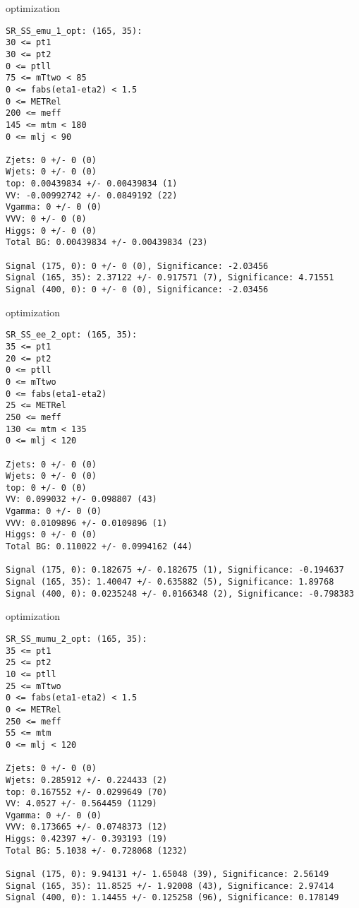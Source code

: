 \begin{frame}[fragile]{optimization}
\tiny
\begin{verbatim}
SR_SS_emu_1_opt: (165, 35):
30 <= pt1
30 <= pt2
0 <= ptll
75 <= mTtwo < 85
0 <= fabs(eta1-eta2) < 1.5
0 <= METRel
200 <= meff
145 <= mtm < 180
0 <= mlj < 90

Zjets: 0 +/- 0 (0)
Wjets: 0 +/- 0 (0)
top: 0.00439834 +/- 0.00439834 (1)
VV: -0.00992742 +/- 0.0849192 (22)
Vgamma: 0 +/- 0 (0)
VVV: 0 +/- 0 (0)
Higgs: 0 +/- 0 (0)
Total BG: 0.00439834 +/- 0.00439834 (23)

Signal (175, 0): 0 +/- 0 (0), Significance: -2.03456
Signal (165, 35): 2.37122 +/- 0.917571 (7), Significance: 4.71551
Signal (400, 0): 0 +/- 0 (0), Significance: -2.03456
\end{verbatim}
\end{frame}

\begin{frame}[fragile]{optimization}
\tiny
\begin{verbatim}
SR_SS_ee_2_opt: (165, 35):
35 <= pt1
20 <= pt2
0 <= ptll
0 <= mTtwo
0 <= fabs(eta1-eta2)
25 <= METRel
250 <= meff
130 <= mtm < 135
0 <= mlj < 120

Zjets: 0 +/- 0 (0)
Wjets: 0 +/- 0 (0)
top: 0 +/- 0 (0)
VV: 0.099032 +/- 0.098807 (43)
Vgamma: 0 +/- 0 (0)
VVV: 0.0109896 +/- 0.0109896 (1)
Higgs: 0 +/- 0 (0)
Total BG: 0.110022 +/- 0.0994162 (44)

Signal (175, 0): 0.182675 +/- 0.182675 (1), Significance: -0.194637
Signal (165, 35): 1.40047 +/- 0.635882 (5), Significance: 1.89768
Signal (400, 0): 0.0235248 +/- 0.0166348 (2), Significance: -0.798383
\end{verbatim}
\end{frame}

\begin{frame}[fragile]{optimization}
\tiny
\begin{verbatim}
SR_SS_mumu_2_opt: (165, 35):
35 <= pt1
25 <= pt2
10 <= ptll
25 <= mTtwo
0 <= fabs(eta1-eta2) < 1.5
0 <= METRel
250 <= meff
55 <= mtm
0 <= mlj < 120

Zjets: 0 +/- 0 (0)
Wjets: 0.285912 +/- 0.224433 (2)
top: 0.167552 +/- 0.0299649 (70)
VV: 4.0527 +/- 0.564459 (1129)
Vgamma: 0 +/- 0 (0)
VVV: 0.173665 +/- 0.0748373 (12)
Higgs: 0.42397 +/- 0.393193 (19)
Total BG: 5.1038 +/- 0.728068 (1232)

Signal (175, 0): 9.94131 +/- 1.65048 (39), Significance: 2.56149
Signal (165, 35): 11.8525 +/- 1.92008 (43), Significance: 2.97414
Signal (400, 0): 1.14455 +/- 0.125258 (96), Significance: 0.178149
\end{verbatim}
\end{frame}

